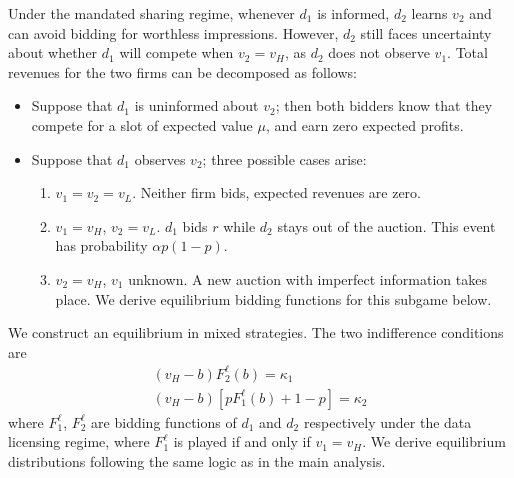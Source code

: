 \documentclass[11pt]{article}
\theoremstyle{plain}
\theoremstyle{definition}
\theoremstyle{plain}
\theoremstyle{plain}
\theoremstyle{plain}
\theoremstyle{plain}
\numberwithin{equation}{section}
\begin{document}
\noindent Under the mandated sharing regime, whenever $ d_1 $ is informed, $ d_2 $ learns $v_2$ and can avoid bidding for worthless impressions. However, $ d_2 $ still faces uncertainty about whether $ d_1 $ will compete when $v_2 = v_H$, as $ d_2 $ does not observe $v_1$. Total revenues for the two firms can be decomposed as follows:
\begin{itemize}
    \item Suppose that $d_1$ is uninformed about $v_2$; then both bidders know that they compete for a slot of expected value $\mu$, and earn zero expected profits.
    \item Suppose that $d_1$ observes $v_2$; three possible cases arise:
    \begin{enumerate}
        \item $v_1 = v_2 = v_L$. Neither firm bids, expected revenues are zero.
        \item $v_1 = v_H$, $v_2 = v_L$. $d_1$ bids $r$ while $d_2$ stays out of the auction. This event has probability $\alpha p (1-p)$.
        \item $v_2 = v_H$, $v_1$ unknown. A new auction with imperfect information takes place. We derive equilibrium bidding functions for this subgame below.
    \end{enumerate}
\end{itemize}
\vspace{2mm}

\noindent We construct an equilibrium in mixed strategies. The two indifference conditions are
\begin{align*}
    (v_H-b)F_2^{\ell}(b) = \kappa_1 \\[5pt]
    (v_H-b)\left[pF_1^{\ell}(b) + 1-p \right] = \kappa_2
\end{align*}
where $F_1^{\ell}$, $F_2^{\ell}$ are bidding functions of $d_1$ and $d_2$ respectively under the data licensing regime, where $F_1^{\ell}$ is played if and only if $v_1 = v_H$. We derive equilibrium distributions following the same logic as in the main analysis. \par 
\vspace{2mm}
\end{document}
